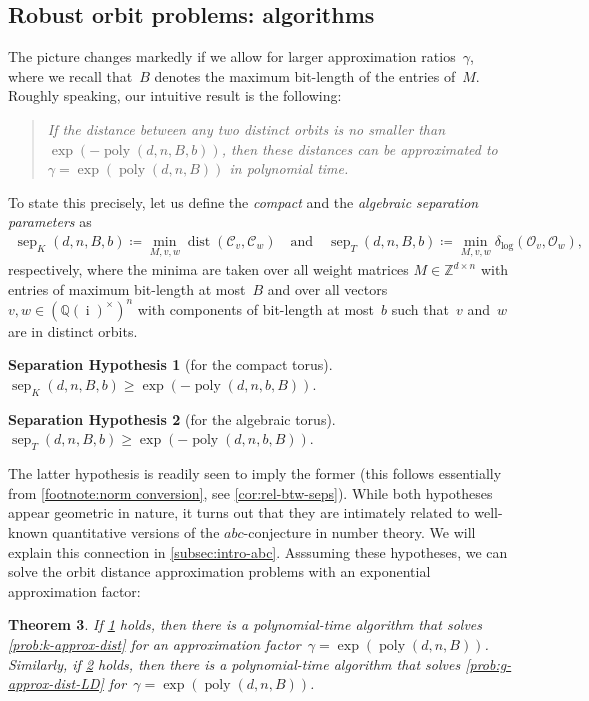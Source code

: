 \documentclass[10pt,a4paper]{article}
\newtheorem{theorem}{Theorem}[section]
\theoremstyle{definition}
\newtheorem{sephypothesis}[theorem]{Separation Hypothesis}\crefname{sephypothesis}{Separation Hypothesis}{Separation Hypotheses}
\DeclareMathOperator{\poly}{poly}
\DeclareMathOperator{\sep}{sep}
\DeclareMathOperator{\ii}{i}
\DeclareMathOperator{\dist}{dist}
\newcommand{\distLD}{\delta_{\log}}
\newcommand{\QQ}{\mathbb{Q}}
\newcommand{\ZZ}{\mathbb{Z}}
\newcommand{\OO}{\ensuremath{\mathcal{O}}}
\newcommand{\KK}{\ensuremath{\mathcal{C}}}
\newcommand{\abc}{\texorpdfstring{$abc$}{abc}}
\numberwithin{equation}{section}
\begin{document}
\subsection{Robust orbit problems: algorithms}\label{subsec:intro algos}
The picture changes markedly if we allow for larger approximation ratios~$\gamma$,
where we recall that~$B$ denotes the maximum bit-length of the entries of~$M$.
Roughly speaking, our intuitive result is the following:
\begin{quote}
  \emph{If the distance between any two distinct orbits is no smaller than $\exp(-\poly(d,n,B,b))$,
  then these distances can be approximated to~$\gamma=\exp(\poly(d,n,B))$ in polynomial time.}
\end{quote}
To state this precisely, let us define the \emph{compact} and the \emph{algebraic separation parameters} as
\begin{align}\label{eq:def-sep}
  \sep_K(d,n,B,b) \coloneqq \min_{M,v,w} \dist(\KK_v,\KK_w)
\quad\text{and}\quad
  \sep_T(d,n,B,b) \coloneqq \min_{M,v,w} \distLD(\OO_v,\OO_w),
\end{align}
respectively, where the minima are taken over all weight matrices $M\in\ZZ^{d\times n}$
with entries of maximum bit-length at most~$B$ and over all vectors $v,w\in (\QQ(\ii)^\times)^n$
with components of bit-length at most~$b$ such that~$v$ and~$w$ are in distinct orbits.

\begin{sephypothesis}[for the compact torus]\label{hyp:compact-separation}
$\sep_{K}(d,n,B,b)\geq\exp(-\poly(d,n,b,B))$.
\end{sephypothesis}

\begin{sephypothesis}[for the algebraic torus]\label{hyp:sep}
$\sep_T(d,n,B,b)\geq \exp(-\poly(d,n,b,B))$. %
\end{sephypothesis}

The latter hypothesis is readily seen to imply the former
(this follows essentially from \cref{footnote:norm conversion},
see \cref{cor:rel-btw-seps}).
While both hypotheses appear geometric in nature, it turns out that they are intimately related
to well-known quantitative versions
of the \abc-conjecture in number theory.
We will explain this connection in \cref{subsec:intro-abc}.
Asssuming these hypotheses, we can solve the orbit distance approximation problems
with an exponential approximation factor:

\begin{theorem}\label{thm:intro-approximation-algorithm}
If \cref{hyp:compact-separation} holds, then there is a polynomial-time algorithm
that solves \cref{prob:k-approx-dist}
for an approximation factor~$\gamma = \exp(\poly(d,n,B))$.
%
Similarly, if \cref{hyp:sep} holds, then there is a polynomial-time algorithm
that solves \cref{prob:g-approx-dist-LD}
for~$\gamma = \exp(\poly(d,n,B))$.
\end{theorem}
\end{document}
